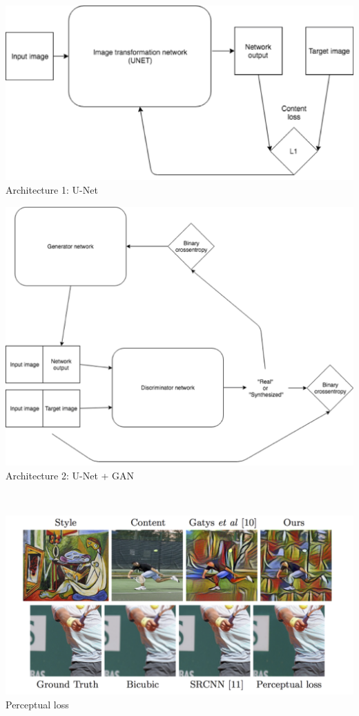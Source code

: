 \documentclass[a0, portrait]{a0poster}
\begin{document}
\begin{multicols}{2}
\begin{minipage}[b]{\linewidth}
\begin{minipage}[b]{0.45\linewidth}
\includegraphics[width=\linewidth]{arch1.png}
\center Architecture 1: U-Net
\end{minipage}
\vspace{0.05\linewidth}
\begin{minipage}[b]{0.45\linewidth}
\includegraphics[width=\linewidth]{arch2.png}
\center Architecture 2: U-Net + GAN
\end{minipage}
\end{minipage}
\\


\begin{minipage}[b]{\linewidth}
\includegraphics[width=\linewidth]{perceptual-loss.png}
\center Perceptual loss
\end{minipage}
\\



\end{multicols}
\end{document}
